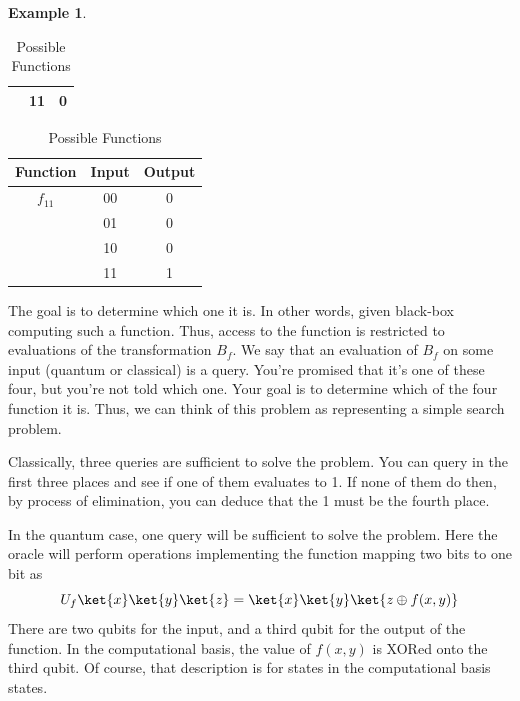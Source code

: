 \documentclass[12pt, oneside]{book}
\theoremstyle{definition}
\theoremstyle{definition}
\newtheorem{example}{Example}[section]
\theoremstyle{remark}
\begin{document}
\begin{example}
\begin{table}[H]
\begin{subtable}[b]{0.45\linewidth}
\begin{tabular}{|c|c|c|}
              & 11 & 0 \\
                \hline
            \end{tabular}
            \caption{$f_{10}$}
        \end{subtable}
        \begin{subtable}[b]{0.45\linewidth}
            \centering
            \begin{tabular}{|c|c|c|}
                \hline
                Function & Input & Output \\
                \hline
                $f_{11}$& 00 & 0 \\
              & 01 & 0 \\
              & 10 & 0 \\
              & 11 & 1 \\
                \hline
            \end{tabular}
            \caption{$f_{11}$}
        \end{subtable}
        \caption{Possible Functions}
        \label{tab:deutsch_example}
\end{table}    
The goal is to determine which one it is. In other words, given  black-box computing such a function. Thus, access to the function is restricted to evaluations of the transformation $B_f$. We say that an evaluation of $B_f$ on some input (quantum or classical) is a query. You're promised that it's one of these four, but you're not told which one. Your goal is to determine which of the four function it is. Thus, we can think of this problem as representing a simple search problem.

Classically, three queries are sufficient to solve the problem. You can query in the first three places and see if one of them evaluates to 1. If none of them do then, by process of elimination, you can deduce that the 1 must be the fourth place.

In the quantum case, one query will be sufficient to solve the problem. Here the oracle will perform operations implementing the function mapping two bits to one bit as
\[
U_f\ket{x}\ket{y}\ket{z}=\ket{x}\ket{y}\ket{z\oplus f(x,y)}
\]
There are two qubits for the input, and a third qubit for the output of the function. In the computational basis, the value of $f(x,y)$ is XORed onto the third qubit. Of course, that description is for states in the computational basis states.


\end{example}
\end{document}
